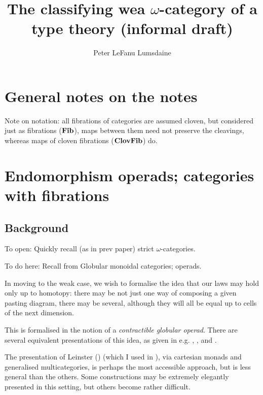 \documentclass{amsart}
\begin{document}

\title{The classifying wea $\omega$-category of a type theory (informal draft)}

\author[P. LeF. Lumsdaine]{Peter LeFanu Lumsdaine}

\maketitle
\tableofcontents

\section{General notes on the notes}

Note on notation: all fibrations of categories are assumed cloven, but considered just as fibrations ($\mathbf{Fib}$), maps between them need not preserve the cleavings, whereas maps of cloven fibrations ($\mathbf{ClovFib}$) do.

\section{Endomorphism operads; categories with fibrations} \label{sec:endo-operads}

\subsection{Background}

To open: Quickly recall (as in prev paper) strict $\omega$-categories.

To do here: Recall from \cite{batanin:natural-environment} Globular monoidal categories; operads.

In moving to the weak case, we wish to formalise the idea that our laws may hold only up to homotopy: there may be not just one way of composing a given pasting diagram, there may be several, although they will all be equal up to cells of the next dimension.

This is formalised in the notion of a \emph{contractible globular operad}.  There are several equivalent presentations of this idea, as given in e.g. \cite{batanin:natural-environment}, \cite{leinster:book}, and \cite{weber:operads-within}.

The presentation of Leinster (\cite{leinster:book}) (which I used in \cite{lumsdaine:tlca}), via cartesian monads and generalised multicategories, is perhaps the most accessible approach, but is less general than the others.  Some constructions may be extremely elegantly presented in this setting, but others become rather difficult.
\end{document}
